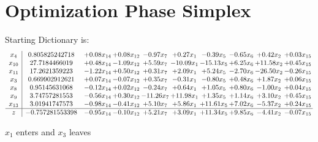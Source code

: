 \documentclass[9pt]{article}
\begin{document}
\section{Optimization Phase Simplex}
Starting Dictionary is:
\[\begin{array}{c| c c@{\hskip 2pt} c@{\hskip 2pt} c@{\hskip 2pt} c@{\hskip 2pt} c@{\hskip 2pt} c@{\hskip 2pt} c@{\hskip 2pt} c@{\hskip 2pt} }
 x_{4}   &  0.805825242718 & +  0.08 x_{14} & +  0.08 x_{12} & -0.97 x_{7} & +  0.27 x_{1} & -0.39 x_{5} & -0.65 x_{6} & +  0.42 x_{2} & +  0.03 x_{15}\\
 x_{10}   &  27.7184466019 & +  0.48 x_{14} & -1.09 x_{12} & +  5.59 x_{7} & -10.09 x_{1} & -15.13 x_{5} & +  6.25 x_{6} & + 11.58 x_{2} & +  0.45 x_{15}\\
 x_{11}   &  17.2621359223 & -1.22 x_{14} & +  0.50 x_{12} & +  0.31 x_{7} & +  2.09 x_{1} & +  5.24 x_{5} & -2.70 x_{6} & -26.50 x_{2} & -0.26 x_{15}\\
 x_{3}   &  0.669902912621 & +  0.07 x_{14} & -0.07 x_{12} & +  0.35 x_{7} & -0.31 x_{1} & -0.80 x_{5} & +  0.48 x_{6} & +  1.87 x_{2} & +  0.06 x_{15}\\
 x_{8}   &  0.95145631068 & -0.12 x_{14} & +  0.02 x_{12} & -0.24 x_{7} & +  0.64 x_{1} & +  1.05 x_{5} & +  0.80 x_{6} & -1.00 x_{2} & +  0.04 x_{15}\\
 x_{9}   &  3.74757281553 & -0.56 x_{14} & +  0.30 x_{12} & -11.26 x_{7} & + 11.98 x_{1} & +  1.35 x_{5} & +  1.14 x_{6} & +  3.10 x_{2} & +  0.45 x_{15}\\
 x_{13}   &  3.01941747573 & -0.98 x_{14} & -0.41 x_{12} & +  5.10 x_{7} & +  5.86 x_{1} & + 11.61 x_{5} & +  7.02 x_{6} & -5.37 x_{2} & +  0.24 x_{15}\\
\hline
z    &  -0.757281553398 & -0.95 x_{14} & -0.10 x_{12} & +  5.21 x_{7} & +  3.09 x_{1} & + 11.34 x_{5} & +  9.85 x_{6} & -4.41 x_{2} & -0.07 x_{15}\\
\end{array}\]


 $ x_{1} $ enters and $ x_{3} $ leaves 
\end{document}
